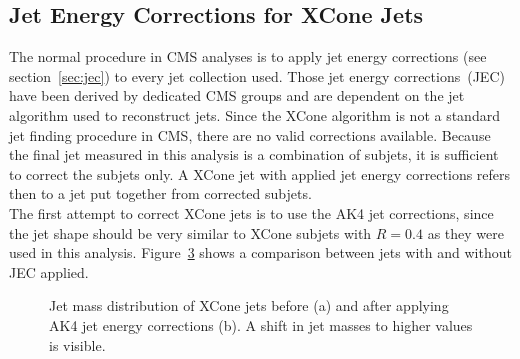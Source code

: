 \subsection{Jet Energy Corrections for XCone Jets} 
	The normal procedure in CMS analyses is to apply jet energy corrections (see section~\ref{sec:jec}) to every jet collection used. Those jet energy corrections~(JEC) have been derived by dedicated CMS groups and are dependent on the jet algorithm used to reconstruct jets. Since the XCone algorithm is not a standard jet finding procedure in CMS, there are no valid corrections available. Because the final jet measured in this analysis is a combination of subjets, it is sufficient to correct the subjets only. A XCone jet with applied jet energy corrections refers then to a jet put together from corrected subjets. \\
	The first attempt to correct XCone jets is to use the AK4 jet corrections, since the jet shape should be very similar to XCone subjets with $R=0.4$ as they were used in this analysis. Figure~\ref{fig:MJet_jec} shows a comparison between jets with and without JEC applied. 
 	\begin{figure}[tb]
 		\begin{subfigure}{.5\textwidth}
 		\centering
 		\caption{}
 		\label{fig:MJet_jec1}
 		\end{subfigure}
 		\begin{subfigure}{.5\textwidth}
 		\centering
 		\caption{}
 		\label{fig:MJet_jec2}
 		\end{subfigure}
 		\caption{Jet mass distribution of XCone jets before (a) and after applying AK4 jet energy corrections (b). A shift in jet masses to higher values is visible.}
 		\label{fig:MJet_jec}
 	\end{figure}	
